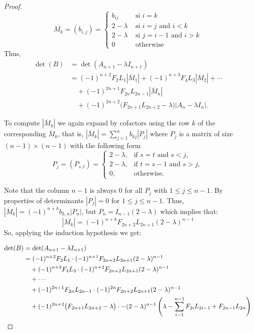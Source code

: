 \documentclass[10pt,a4paper]{amsart}
\begin{document}
\begin{proof}
$$
\overline{M_k}=(b_{i,j})= \begin{cases}b_{ij} & \text { si } i=k \\ 
2-\lambda & \text { si } i=j  \text{ and } i<k \\ 
2-\lambda & \text { si } j=i-1 \text { and } i>k \\ 
0 & \text { otherwise }\end{cases}
$$
Thus,
\begin{align*}
\operatorname{det}(B)
&= \operatorname{det}(A_{n+1}-\lambda I_{n+1}) \\
&= (-1)^{n+2}F_2L_1|\overline{M}_1|
 + (-1)^{n+3}F_{4}L_{3}|\overline{M}_2| + \cdots \\
&\quad + (-1)^{2n+1}F_{2n}L_{2n-1}|\overline{M}_n| \\
&\quad + (-1)^{2n+2}\bigl(F_{2n+1}L_{2n+2}-\lambda\bigr)|A_n-\lambda I_n|.
\end{align*}

\noindent To compute $|\overline{M}_k|$ we again expand by cofactors using the row $k$ of the corresponding $\overline{M}_k$, that is, $|\overline{M}_k|=\displaystyle \sum_{j=1}^{n}b_{kj}|P_j|$ where $P_j$ is a matrix of size $(n-1)\times(n-1)$ with the following form
\[
P_j = (P_{s,t})=
\begin{cases}
2 - \lambda, & \text{if } s = t \text{ and } s < j, \\
2 - \lambda, & \text{if } t = s - 1 \text{ and } s > j, \\
0,           & \text{otherwise}.
\end{cases}
\]

\noindent Note that the column $n-1$ is always $0$ for all $P_j$ with $1\leq j \leq n-1$. By properties of determinants $|P_j|=0$ for $1\leq j \leq n-1$. Thus, $|\overline{M}_k|=(-1)^{n+k}b_{k,n}|P_n|$, but $P_n=I_{n-1}(2-\lambda)$ which implies that: 
\[|\overline{M_{k}}|=(-1)^{n+k}F_{2n+2}L_{2n+1}(2-\lambda)^{n-1}\]
So, applying the induction hypothesis we get: 

\begin{align}
\operatorname{det}(B)
&= \operatorname{det}(A_{n+1}-\lambda I_{n+1}) \notag \\
&= (-1)^{n+2}F_{2}L_{1}\cdot(-1)^{n+1}F_{2n+2}L_{2n+1}(2-\lambda)^{n-1} \notag \\
&\quad + (-1)^{n+3}F_{4}L_{3}\cdot(-1)^{n+2}F_{2n+2}L_{2n+1}(2-\lambda)^{n-1} \notag \\
&\quad + \cdots \notag \\
&\quad + (-1)^{2n+1}F_{2n}L_{2n-1}\cdot(-1)^{2n}F_{2n+2}L_{2n+1}(2-\lambda)^{n-1} \notag \\
&\quad + (-1)^{2n+2}\bigl(F_{2n+1}L_{2n+2}-\lambda\bigr) \cdot -(2-\lambda)^{n-1}
\left(\lambda-\sum_{i=1}^{n-1}F_{2i}L_{2i-1}+F_{2n-1}L_{2n}\right)\notag
\end{align}


\end{proof}
\end{document}
